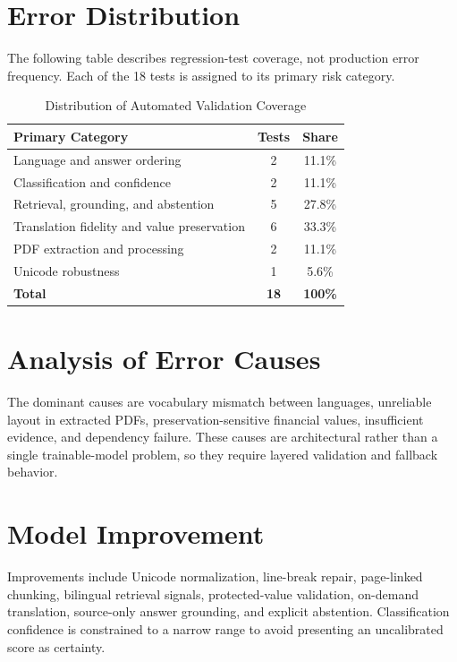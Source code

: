 \section{Error Distribution}
The following table describes regression-test coverage, not production error frequency. Each of the 18 tests is assigned to its primary risk category.

\begin{table}[H]
\centering
\caption{Distribution of Automated Validation Coverage}
\begin{tabular}{|p{7cm}|c|c|}
\hline
\textbf{Primary Category} & \textbf{Tests} & \textbf{Share} \\
\hline
Language and answer ordering & 2 & 11.1\% \\
\hline
Classification and confidence & 2 & 11.1\% \\
\hline
Retrieval, grounding, and abstention & 5 & 27.8\% \\
\hline
Translation fidelity and value preservation & 6 & 33.3\% \\
\hline
PDF extraction and processing & 2 & 11.1\% \\
\hline
Unicode robustness & 1 & 5.6\% \\
\hline
\textbf{Total} & \textbf{18} & \textbf{100\%} \\
\hline
\end{tabular}
\end{table}

\section{Analysis of Error Causes}
The dominant causes are vocabulary mismatch between languages, unreliable layout in extracted PDFs, preservation-sensitive financial values, insufficient evidence, and dependency failure. These causes are architectural rather than a single trainable-model problem, so they require layered validation and fallback behavior.

\section{Model Improvement}
Improvements include Unicode normalization, line-break repair, page-linked chunking, bilingual retrieval signals, protected-value validation, on-demand translation, source-only answer grounding, and explicit abstention. Classification confidence is constrained to a narrow range to avoid presenting an uncalibrated score as certainty.

